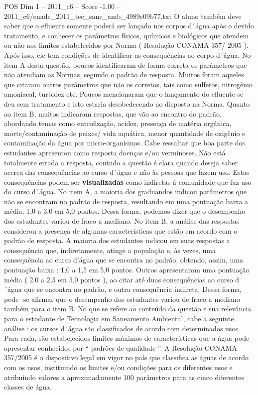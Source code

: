 \begin{textsample}{POS Dim 1 – 2011\_c6 – Score -1.00 – 2011\_c6/enade\_2011\_tec\_sane\_amb\_4989e09b77.txt}
O aluno também deve saber que o efluente somente poderá ser lançado nos corpos d´água após o devido tratamento, e conhecer os parâmetros físicos, químicos e biológicos que atendem ou não aos limites estabelecidos por Norma ( Resolução CONAMA 357/ 2005 ).
Após isso, ele tem condições de identificar as consequências ao corpo d´água.
No item A desta questão, poucos identificaram de forma correta os parâmetros que não atendiam as Normas, segundo o padrão de resposta.
Muitos foram aqueles que citaram outros parâmetros que não os corretos, tais como sulfetos, nitrogênio amoniacal, turbidez etc.
Poucos mencionaram que o lançamento do efluente se deu sem tratamento e isto estaria desobedecendo ao disposto na Norma.
Quanto ao item B, muitos indicaram respostas, que vão ao encontro do padrão, abordando temas como eutrofização, acidez, presença de matéria orgânica, morte/contaminação de peixes/ vida aquática, menor quantidade de oxigênio e contaminação da água por micro-organismos.
Cabe ressaltar que boa parte dos estudantes apresentou como resposta doenças e/ou verminoses.
Não está totalmente errada a resposta, contudo a questão é clara quando deseja saber acerca das consequências ao curso d´água e não às pessoas que fazem uso.
Estas consequências podem ser \textbf{visualizadas} como indiretas à comunidade que faz uso do curso d´água.
No item A, a maioria dos graduandos indicou parâmetros que não se encontram no padrão de resposta, resultando em uma pontuação baixa a média, 1,0 a 3,0 em 5,0 pontos.
Dessa forma, podemos dizer que o desempenho dos estudantes variou de fraco a mediano.
No item B, a análise das respostas considerou a presença de algumas características que estão em acordo com o padrão de resposta.
A maioria dos estudantes indicou em suas respostas a consequência que, indiretamente, atinge a população e, às vezes, uma consequência ao curso d’água que se encontra no padrão, obtendo, assim, uma pontuação baixa : 1,0 a 1,5 em 5,0 pontos.
Outros apresentaram uma pontuação média ( 2,0 a 2,5 em 5,0 pontos ), ao citar até duas consequências ao curso d´água que se encontra no padrão, e outra consequência indireta.
Dessa forma, pode -se afirmar que o desempenho dos estudantes variou de fraco a mediano também para o item B.
No que se refere ao conteúdo da questão e sua relevância para o estudante de Tecnologia em Saneamento Ambiental, cabe a seguinte análise : os cursos d´água são classificados de acordo com determinados usos.
Para cada, são estabelecidos limites máximos de características que a água pode apresentar conhecidos por “ padrões de qualidade ”.
A Resolução CONAMA 357/2005 é o dispositivo legal em vigor no país que classifica as águas de acordo com os usos, instituindo os limites e/ou condições para os diferentes usos e atribuindo valores a aproximadamente 100 parâmetros para as cinco diferentes classes de água.

\end{textsample}
